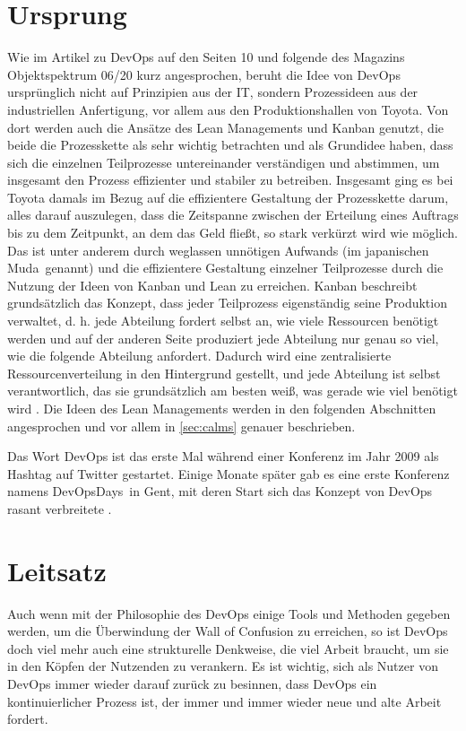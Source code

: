 \section{Ursprung}

Wie im Artikel zu \ac{DevOps} auf den Seiten 10 und folgende des Magazins Objektspektrum 06/20 \cite{spektrum1} kurz angesprochen, beruht die Idee von \ac{DevOps} ursprünglich nicht auf Prinzipien aus der IT, sondern Prozessideen aus der industriellen Anfertigung, vor allem aus den Produktionshallen von Toyota. Von dort werden auch die Ansätze des Lean Managements und Kanban genutzt, die beide die Prozesskette als sehr wichtig betrachten und als Grundidee haben, dass sich die einzelnen Teilprozesse untereinander verständigen und abstimmen, um insgesamt den Prozess effizienter und stabiler zu betreiben. Insgesamt ging es bei Toyota damals im Bezug auf die effizientere Gestaltung der Prozesskette darum, alles darauf auszulegen, dass die Zeitspanne zwischen der Erteilung eines Auftrags bis zu dem Zeitpunkt, an dem das Geld fließt, so stark verkürzt wird wie möglich. \cite{halstenberg:2020} Das ist unter anderem durch weglassen unnötigen Aufwands (im japanischen \glqq Muda\grqq\ genannt) und die effizientere Gestaltung einzelner Teilprozesse durch die Nutzung der Ideen von Kanban und Lean zu erreichen. Kanban beschreibt grundsätzlich das Konzept, dass jeder Teilprozess eigenständig seine Produktion verwaltet, d. h. jede Abteilung fordert selbst an, wie viele Ressourcen benötigt werden und auf der anderen Seite produziert jede Abteilung nur genau so viel, wie die folgende Abteilung anfordert. Dadurch wird eine zentralisierte Ressourcenverteilung in den Hintergrund gestellt, und jede Abteilung ist selbst verantwortlich, das sie grundsätzlich am besten weiß, was gerade wie viel benötigt wird \cite{ohno:1988}. Die Ideen des Lean Managements werden in den folgenden Abschnitten angesprochen und vor allem in \autoref{sec:calms} genauer beschrieben.

Das Wort \ac{DevOps} ist das erste Mal während einer Konferenz im Jahr 2009 als Hashtag auf Twitter gestartet. Einige Monate später gab es eine erste Konferenz namens \glqq DevOpsDays\grqq\ in Gent, mit deren Start sich das Konzept von \ac{DevOps} rasant verbreitete \cite{halstenberg:2020}.

\section{Leitsatz}

Auch wenn mit der Philosophie des \ac{DevOps} einige Tools und Methoden gegeben werden, um die Überwindung der Wall of Confusion zu erreichen, so ist \ac{DevOps} doch viel mehr auch eine strukturelle Denkweise, die viel Arbeit braucht, um sie in den Köpfen der Nutzenden zu verankern. Es ist wichtig, sich als Nutzer von \ac{DevOps} immer wieder darauf zurück zu besinnen, dass \ac{DevOps} ein kontinuierlicher Prozess ist, der immer und immer wieder neue und alte Arbeit fordert.


